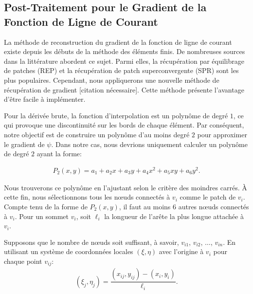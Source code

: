 \documentclass[12pt]{book}
\theoremstyle{bfnote}
\theoremstyle{bfnote}
\begin{document}
\subsection{Post-Traitement pour le Gradient de la Fonction de Ligne de Courant} %
\label{subsec:Post_Traitement_pour_le_Gradient_de_la_Fonction_de_Ligne_de_Courant}

La méthode de reconstruction du gradient de la fonction de ligne de courant existe depuis les débuts de la méthode des éléments finis. De nombreuses sources dans la littérature abordent ce sujet. Parmi elles, la récupération par équilibrage de patches (REP) et la récupération de patch superconvergente (SPR) sont les plus populaires. Cependant, nous appliquerons une nouvelle méthode de récupération de gradient [citation nécessaire]. Cette méthode présente l'avantage d'être facile à implémenter.

Pour la dérivée brute, la fonction d'interpolation est un polynôme de degré $1$, ce qui provoque une discontinuité sur les bords de chaque élément. Par conséquent, notre objectif est de construire un polynôme d'au moins degré $2$ pour approximer le gradient de $\psi$. Dans notre cas, nous devrions uniquement calculer un polynôme de degré $2$ ayant la forme:

\begin{align}
    P_2(x,y) = a_1 + a_2 x + a_3 y + a_4 x^2 + a_5 xy + a_6 y^2.
\end{align}

Nous trouverons ce polynôme en l'ajustant selon le critère des moindres carrés. À cette fin, nous sélectionnons tous les nœuds connectés à $v_i$ comme le patch de $v_i$. Compte tenu de la forme de $P_2(x,y)$, il faut au moins 6 autres nœuds connectés à $v_i$. Pour un sommet $v_i$, soit $\ell_i$ la longueur de l'arête la plus longue attachée à $v_i$.

Supposons que le nombre de nœuds soit suffisant, à savoir, $v_{i1}$, $v_{i2}$, $\ldots$, $v_{in}$. En utilisant un système de coordonnées locales $(\xi, \eta)$ avec l'origine à $v_i$ pour chaque point $v_{ij}$:
\begin{align}
    (\xi_j, \eta_j) = \dfrac{(x_{ij},y_{ij}) - (x_i,y_i)}{\ell_i}.
\end{align}
\end{document}
